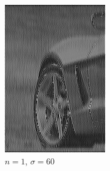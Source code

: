 \documentclass[
	12pt, %
]{style/fphw}
\begin{document}
\begin{figure}[H]
\begin{subfigure}[b]{.22\textwidth}
             \includegraphics[width=\textwidth]{Q5_3_1_60.png}
             \caption{$n=1$, $\sigma=60$}
             \label{Q5_3_1_60.tif}
         \end{subfigure}
         \hfill
         \begin{subfigure}[b]{.22\textwidth}
             \centering

\end{subfigure}
\end{figure}
\end{document}
